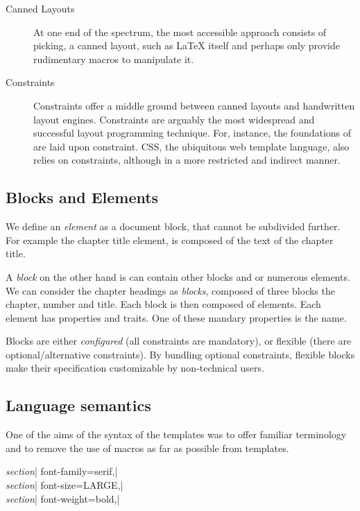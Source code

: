 \begin{description}
\item [Canned Layouts] At one end of the spectrum, the most accessible approach consists of picking, a canned layout, such as LaTeX itself and perhaps only provide rudimentary macros to manipulate it.
\item [Constraints] Constraints offer a middle ground between canned layouts and handwritten layout engines. Constraints are arguably the most widespread and successful layout programming technique. For, instance, the foundations of \tex are laid upon constraint. CSS, the ubiquitous web template language, also relies on constraints, although in a more restricted and indirect manner.
\end{description}

\subsection{Blocks and Elements}

We define an \emph{element} as a document block, that cannot be subdivided further. For example the chapter title element, is composed of the text of the chapter title. 

A \emph{block} on the other hand is can contain other blocks and or numerous elements. We can consider the chapter headings as \emph{blocks}, composed of three blocks the chapter, number and title. Each block is then composed of elements. Each element has properties and traits. One of these mandary properties is the name. 

Blocks are either \emph{configured} (all constraints are mandatory), or flexible (there are optional/alternative constraints). By bundling optional constraints, flexible blocks make their specification customizable by non-technical users. 

\subsection{Language semantics}

One of the aims of the syntax of the templates was to offer familiar terminology and to remove the use
of \tex macros as far as possible from templates. 
\medskip

{\parindent0pt

 \textit{section}| font-family=serif,|\\
 \textit{section}| font-size=LARGE,|\\
 \textit{section}| font-weight=bold,|\\
}

